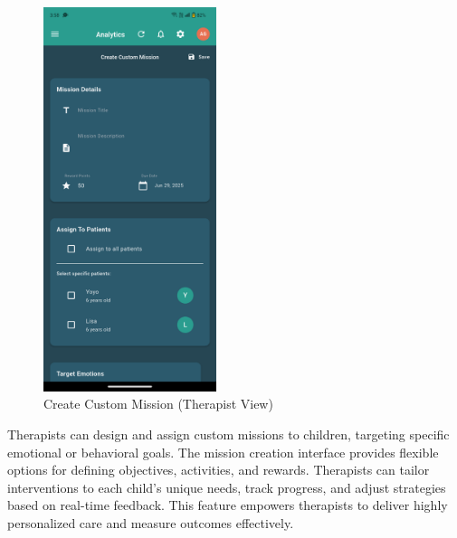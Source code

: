 \documentclass[12pt,a4paper]{article}
\begin{document}
\begin{figure}[H]
    \centering
    \includegraphics[width=0.45\textwidth]{Screenshots/createcustommissiontherapist.png}
    \caption{Create Custom Mission (Therapist View)}
    \label{fig:create-mission-therapist}
\end{figure}
Therapists can design and assign custom missions to children, targeting specific emotional or behavioral goals. The mission creation interface provides flexible options for defining objectives, activities, and rewards. Therapists can tailor interventions to each child's unique needs, track progress, and adjust strategies based on real-time feedback. This feature empowers therapists to deliver highly personalized care and measure outcomes effectively.
\end{document}
